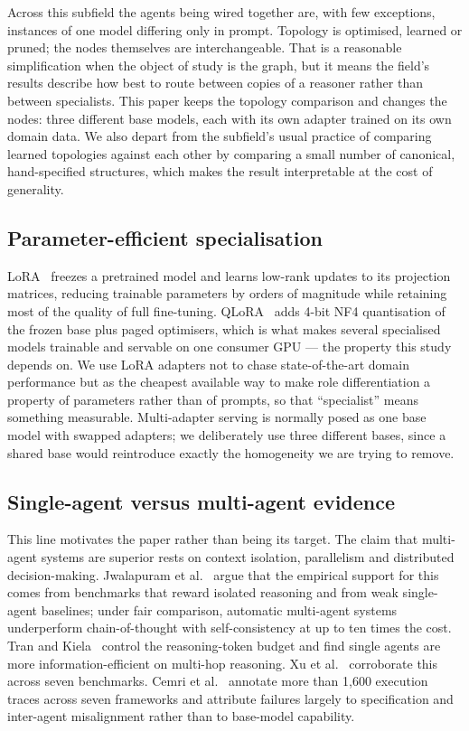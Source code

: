 \documentclass[journal,10pt,compsoc,onecolumn]{IEEEtran}
\begin{document}
Across this subfield the agents being wired together are, with few exceptions,
instances of one model differing only in prompt. Topology is optimised, learned
or pruned; the nodes themselves are interchangeable. That is a reasonable
simplification when the object of study is the graph, but it means the field's
results describe how best to route between copies of a reasoner rather than
between specialists. This paper keeps the topology comparison and changes the
nodes: three different base models, each with its own adapter trained on its own
domain data. We also depart from the subfield's usual practice of comparing
learned topologies against each other by comparing a small number of canonical,
hand-specified structures, which makes the result interpretable at the cost of
generality.

\subsection{Parameter-efficient specialisation}
LoRA~\cite{hu2021lora} freezes a pretrained model and learns low-rank updates to
its projection matrices, reducing trainable parameters by orders of magnitude
while retaining most of the quality of full fine-tuning.
QLoRA~\cite{dettmers2023qlora} adds 4-bit NF4 quantisation of the frozen base
plus paged optimisers, which is what makes several specialised models trainable
and servable on one consumer GPU --- the property this study depends on. We use
LoRA adapters not to chase state-of-the-art domain performance but as the
cheapest available way to make role differentiation a property of parameters
rather than of prompts, so that ``specialist'' means something measurable.
Multi-adapter serving is normally posed as one base model with swapped
adapters; we deliberately use three different bases, since a shared base would
reintroduce exactly the homogeneity we are trying to remove.

\subsection{Single-agent versus multi-agent evidence}
This line motivates the paper rather than being its target. The claim that
multi-agent systems are superior rests on context isolation, parallelism and
distributed decision-making. Jwalapuram
et al.~\cite{jwalapuram2026illusion} argue that the empirical support for this
comes from benchmarks that reward isolated reasoning and from weak single-agent
baselines; under fair comparison, automatic multi-agent systems underperform
chain-of-thought with self-consistency at up to ten times the cost. Tran and
Kiela~\cite{tran2026singleagent} control the reasoning-token budget and find
single agents are more information-efficient on multi-hop reasoning. Xu
et al.~\cite{xu2026oneflow} corroborate this across seven benchmarks. Cemri
et al.~\cite{cemri2025mast} annotate more than 1{,}600 execution traces across
seven frameworks and attribute failures largely to specification and inter-agent
misalignment rather than to base-model capability.
\end{document}
